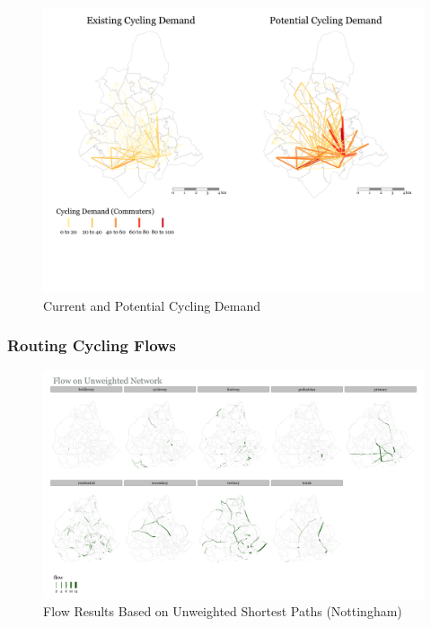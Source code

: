 \documentclass[
]{article}
\begin{document}
\begin{figure}[H]

{\centering \includegraphics[width=0.8\linewidth]{data/Nottingham/Plots/desire_facet_cycling} 

}

\caption{Current and Potential Cycling Demand}\label{fig:desirefacetcyclingNottingham}
\end{figure}

\clearpage

\subsubsection{Routing Cycling Flows}

\begin{figure}

{\centering \includegraphics[width=0.75\linewidth]{data/Nottingham/Plots/flows_facet_unweighted_Nottingham} 

}

\caption{Flow Results Based on Unweighted Shortest Paths (Nottingham)}\label{fig:flowsfacetunweightedNottingham}
\end{figure}
\end{document}
